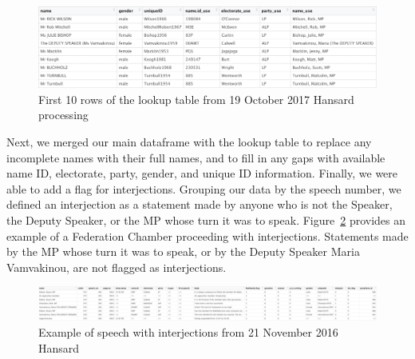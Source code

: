 \documentclass[
  letterpaper,
  DIV=11,
  numbers=noendperiod]{scrartcl}
\begin{document}
\begin{figure}

{\centering \includegraphics[width=4.66667in,height=\textheight]{lookup_ex.jpg}

}

\caption{\label{fig-lookup}First 10 rows of the lookup table from 19
October 2017 Hansard processing}

\end{figure}

Next, we merged our main dataframe with the lookup table to replace any
incomplete names with their full names, and to fill in any gaps with
available name ID, electorate, party, gender, and unique ID information.
Finally, we were able to add a flag for interjections. Grouping our data
by the speech number, we defined an interjection as a statement made by
anyone who is not the Speaker, the Deputy Speaker, or the MP whose turn
it was to speak. Figure~\ref{fig-interject} provides an example of a
Federation Chamber proceeding with interjections. Statements made by the
MP whose turn it was to speak, or by the Deputy Speaker Maria
Vamvakinou, are not flagged as interjections.

\begin{figure}

{\centering \includegraphics{interject_ex.jpg}

}

\caption{\label{fig-interject}Example of speech with interjections from
21 November 2016 Hansard}

\end{figure}
\end{document}
